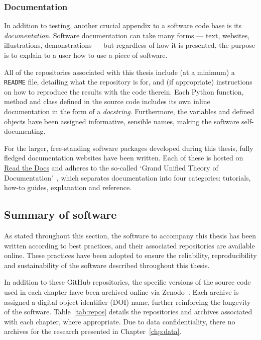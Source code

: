\subsubsection{Documentation}

In addition to testing, another crucial appendix to a software code base is its
\emph{documentation}. Software documentation can take many forms --- text,
websites, illustrations, demonstrations --- but regardless of how it is
presented, the purpose is to explain to a user how to use a piece of software.

All of the repositories associated with this thesis include (at a minimum) a
\texttt{README} file, detailing what the repository is for, and (if
appropriate) instructions on how to reproduce the results with the code therein.
Each Python function, method and class defined in the source code includes its
own inline documentation in the form of a \emph{docstring}. Furthermore, the
variables and defined objects have been assigned informative, sensible names,
making the software self-documenting.

For the larger, free-standing software packages developed during this thesis,
fully fledged documentation websites have been written. Each of these is hosted
on \href{https://readthedocs.org/}{Read the Docs} and adheres to the so-called
`Grand Unified Theory of Documentation'~\cite{documentation}, which separates
documentation into four categories: tutorials, how-to guides, explanation and
reference.

\subsection{Summary of software}

As stated throughout this section, the software to accompany this thesis has
been written according to best practices, and their associated repositories are
available online. These practices have been adopted to ensure the reliability,
reproducibility and sustainability of the software described throughout this
thesis.

In addition to these GitHub repositories, the specific versions of the source
code used in each chapter have been archived online via Zenodo~\cite{zenodo}.
Each archive is assigned a digital object identifier (DOI) name, further
reinforcing the longevity of the software. Table~\ref{tab:repos} details the
repositories and archives associated with each chapter, where appropriate. Due
to data confidentiality, there no archives for the research presented in
Chapter~\ref{chp:data}.

